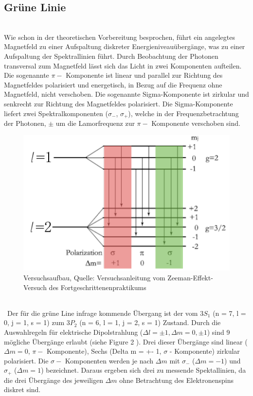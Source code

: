 \documentclass[10pt,a4paper]{article}
\begin{document}
\subsection{Grüne Linie}
\\
Wie schon in der theoretischen Vorbereitung besprochen, führt ein angelegtes Magnetfeld zu einer Aufspaltung diskreter Energieniveauübergänge, was zu einer Aufspaltung der Spektrallinien führt. Durch Beobachtung der Photonen transversal zum Magnetfeld lässt sich das Licht in zwei Komponenten aufteilen. Die sogenannte $\pi - $ Komponente ist linear und parallel zur Richtung des Magnetfeldes polarisiert und energetisch, in Bezug auf die Frequenz ohne Magnetfeld, nicht verschoben. Die sogenannte Sigma-Komponente ist zirkular und senkrecht zur Richtung des Magnetfeldes polarisiert. Die Sigma-Komponente liefert zwei Spektralkomponenten ($\sigma _{-}$, $\sigma _{+}$), welche in der Frequenzbetrachtung der Photonen, $\pm $ um   die Lamorfrequenz zur $\pi - $ Komponente verschoben sind.  
\\
\begin{figure}[h]
	\includegraphics[scale = 1]{Zeeman_splitting.png}
	\centering
	\caption{Versuchsaufbau, Quelle: Versuchsanleitung vom Zeeman-Effekt-Versuch des Fortgeschrittenenpraktikums}
	\label{aufbau2}
\end{figure}
\\\
Der für die grüne Line infrage kommende Übergang ist der vom $3S_{1}$ (n = 7, l = 0, j = 1, s = 1) zum $3P_{2}$ (n = 6, l = 1, j = 2, s = 1) Zustand. Durch die Auswahlregeln für elektrische Dipolstrahlung ($\Delta l = \pm 1 , \Delta m =  0,\pm1$) sind 9 mögliche Übergänge erlaubt (siehe Figure 2 ). Drei dieser Übergänge sind linear ($\Delta m = 0$, $\pi - $ Komponente), Sechs (Delta m = +- 1, $\sigma   $ - Komponente) zirkular polarisiert. Die $\sigma -  $ Komponenten  werden je nach $ \Delta m $ mit $\sigma _{-}  $ ($\Delta m = -1$) und $\sigma _{+}  $ ($\Delta m = 1$) bezeichnet.   Daraus ergeben sich drei zu messende Spektallinien, da die drei Übergänge des jeweiligen $\Delta m$ ohne Betrachtung des Elektronenspins diskret sind.
\end{document}
